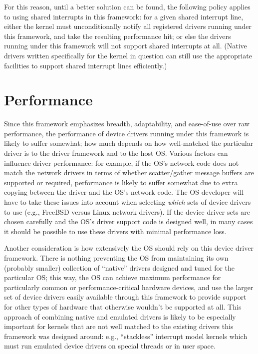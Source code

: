 For this reason, until a better solution can be found,
the following policy applies to using shared interrupts in this framework:
for a given shared interrupt line,
either the kernel must unconditionally notify
all registered drivers running under this framework,
and take the resulting performance hit;
or else the drivers running under this framework
will not support shared interrupts at all.
(Native drivers written specifically for the kernel in question
can still use the appropriate facilities
to support shared interrupt lines efficiently.)

\section{Performance}
\label{fdev-perf}

Since this framework emphasizes breadth, adaptability, and ease-of-use
over raw performance,
the performance of device drivers running under this framework
is likely to suffer somewhat;
how much depends on how well-matched the particular driver is
to the driver framework and to the host OS\@.
Various factors can influence driver performance:
for example, if the OS's network code does not match the network drivers
in terms of whether scatter/gather message buffers are supported or required,
performance is likely to suffer somewhat due to extra copying
between the driver and the OS's network code.
The OS developer will have to take these issues into account
when selecting \emph{which} sets of device drivers to use
(e.g., FreeBSD versus Linux network drivers).
If the device driver sets are chosen carefully
and the OS's driver support code is designed well,
in many cases it should be possible to use these drivers
with minimal performance loss.

Another consideration is how extensively the OS
should rely on this device driver framework.
There is nothing preventing the OS from maintaining
its own (probably smaller) collection of ``native'' drivers
designed and tuned for the particular OS;
this way, the OS can achieve maximum performance
for particularly common or performance-critical hardware devices,
and use the larger set of device drivers
easily available through this framework
to provide support for other types of hardware
that otherwise wouldn't be supported at all.
This approach of combining native and emulated drivers
is likely to be especially important
for kernels that are not well matched to the existing drivers
this framework was designed around:
e.g., ``stackless'' interrupt model kernels
which must run emulated device drivers on special threads or in user space.


